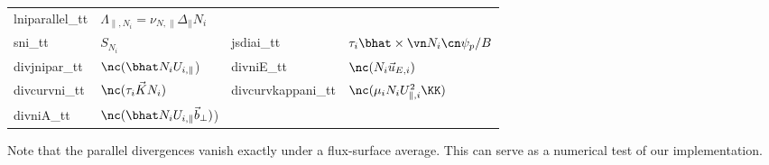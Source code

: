 \begin{longtable}{llll}
    lniparallel\_tt &$ \Lambda_{\parallel,N_i} = \nu_{N,\parallel} \Delta_\parallel N_i$ \\
    sni\_tt & $S_{N_i}$ &
    jsdiai\_tt & $\tau_i \bhat \times \vn N_i \cn \psi_p /B$\\
    divjnipar\_tt & $\nc (\bhat N_i U_{i,\parallel}$) &
    divniE\_tt & $\nc ( N_i \vec u_{E,i})$ \\
    divcurvni\_tt & $\nc( \tau_i \vec K N_i)$ &
    divcurvkappani\_tt & $\nc( \mu_i N_i U_{\parallel,i}^2 \KK)$ \\
    divniA\_tt & $\nc (\bhat N_i U_{i,\parallel} {\vec b}_\perp)$) &
     &  \\
\bottomrule
\end{longtable}

Note that the parallel divergences vanish exactly under a flux-surface average. This can serve as a numerical test of our implementation.
